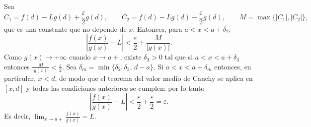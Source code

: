 \begin{prueba}
\begin{equation*}
    \end{equation*}
    Sea
    \[
    C_1=f( d) -Lg( d) +\frac{\varepsilon }{2} g( d),
    \qquad
    C_2=f( d) -Lg( d) -\frac{\varepsilon }{2} g( d),
    \qquad
    M=\max\{| C_1| ,| C_2| \},
    \]
    que es una constante que no depende de $x$. Entonces, para $a< x< a+\delta _{2}$:
    \begin{equation*}
    \left| \frac{f( x)}{g( x)} -L\right| < \frac{\varepsilon }{2} +\frac{M}{| g( x)| }.
    \end{equation*}
    Como $g( x) \to +\infty$ cuando $x\to a+$, existe $\delta _{3} > 0$ tal que si $a< x< a+ \delta _{3}$ entonces $\frac{M}{| g( x)| } < \frac{\varepsilon }{2}$. Sea $\delta _{m} =\min\{\delta _{2} ,\delta _{3} ,\, d-a\}$. Si $a< x< a+\delta _{m}$ entonces, en particular, $x< d$, de modo que el teorema del valor medio de Cauchy se aplica en $[x,d]$ y todas las condiciones anteriores se cumplen; por lo tanto
    \[
    \left| \frac{f( x)}{g( x)} -L\right| < \frac{\varepsilon }{2} +\frac{\varepsilon }{2} =\varepsilon.
    \]
    Es decir, $\lim _{x\to a+}\frac{f( x)}{g( x)} =L$.
\end{prueba}
